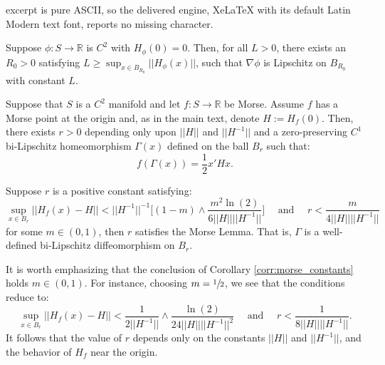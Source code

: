 \documentclass[10pt,a4paper]{amsart}
\begin{document}
excerpt is pure ASCII, so the delivered engine, XeLaTeX with its default Latin Modern text font, reports no missing character.
    \begin{lemma}\label{lem:lipschitz}
        Suppose $\phi:S\rightarrow \mathbb{R}$ is $C^2$ with $H_\phi(0)=0$. Then, for all $L>0$, there exists an $R_0>0$ satisfying $L\geq \sup_{x\in B_{R_0}}||H_\phi(x)||$, such that $\nabla \phi$ is Lipschitz on $B_{R_0}$ with constant $L$.
    \end{lemma}

\begin{lemma}\label{lem:morse} Suppose that $S$ is a $C^{2}$ manifold and let $f:S\rightarrow \mathbb{R}$ be Morse. Assume $f$ has a Morse point at the origin and, as in the main text, denote $H:=H_f(0)$. Then, there exists $r >0$ depending only upon $||H||$ and $||H^{-1}||$ and a zero-preserving $C^1$ bi-Lipschitz homeomorphism $\Gamma(x)$ defined on the ball $B_r$ such that:
\begin{equation}\nonumber
   f(\Gamma(x)) = \frac{1}{2}x'Hx.
\end{equation}
\end{lemma}

    \begin{corr}\label{corr:morse_constants}
        Suppose $r$ is a positive constant satisfying:
        \begin{equation}\nonumber
            \sup_{x\in B_r}||H_f(x)-H|| < ||H^{-1}||^{-1}\bigg[(1-m) \land  \frac{m^2\ln(2)}{6||H||||H^{-1}||}\bigg] \quad \text{ and }\quad r < \frac{m}{4||H||||H^{-1}||}
        \end{equation}
        for some $m\in (0,1)$, then $r$ satisfies the Morse Lemma. That is, $\Gamma$ is a well-defined bi-Lipschitz diffeomorphism on $B_{r}$.
    \end{corr}

\begin{remark}
    It is worth emphasizing that the conclusion of Corollary \ref{corr:morse_constants} holds  $m\in (0,1)$. For instance, choosing $m=\sfrac{1}{2}$, we see that the conditions reduce to:
        \begin{equation}\nonumber
            \sup_{x\in B_r}||H_f(x)-H|| < \frac{1}{2||H^{-1}||} \land  \frac{\ln(2)}{24||H||||H^{-1}||^2} \quad \text{ and }\quad r < \frac{1}{8||H||||H^{-1}||}.
        \end{equation}
    It follows that the value of $r$ depends only on the constants $||H||$ and $||H^{-1}||$, and the behavior of $H_f$ near the origin.
\end{remark}
\end{document}
